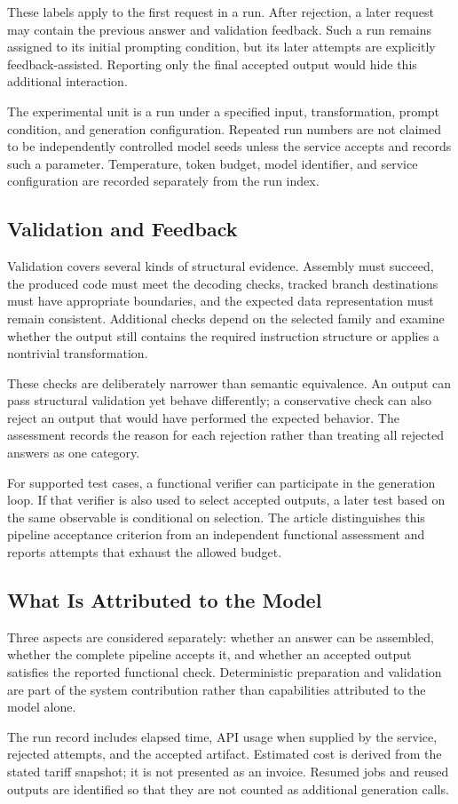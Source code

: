 These labels apply to the first request in a run. After rejection, a
later request may contain the previous answer and validation feedback.
Such a run remains assigned to its initial prompting condition, but its
later attempts are explicitly feedback-assisted. Reporting only the
final accepted output would hide this additional interaction.

The experimental unit is a run under a specified input, transformation,
prompt condition, and generation configuration. Repeated run numbers
are not claimed to be independently controlled model seeds unless the
service accepts and records such a parameter. Temperature, token
budget, model identifier, and service configuration are recorded
separately from the run index.

\subsection{Validation and Feedback}
Validation covers several kinds of structural evidence. Assembly must
succeed, the produced code must meet the decoding checks, tracked branch
destinations must have appropriate boundaries, and the expected data
representation must remain consistent. Additional checks depend on the
selected family and examine whether the output still contains the
required instruction structure or applies a nontrivial transformation.

These checks are deliberately narrower than semantic equivalence.
An output can pass structural validation yet behave differently; a
conservative check can also reject an output that would have performed
the expected behavior. The assessment records the reason for each
rejection rather than treating all rejected answers as one category.

For supported test cases, a functional verifier can participate in the
generation loop. If that verifier is also used to select accepted
outputs, a later test based on the same observable is conditional on
selection. The article distinguishes this pipeline acceptance criterion
from an independent functional assessment and reports attempts that
exhaust the allowed budget.

\subsection{What Is Attributed to the Model}
Three aspects are considered separately: whether an answer can be
assembled, whether the complete pipeline accepts it, and whether an
accepted output satisfies the reported functional check. Deterministic
preparation and validation are part of the system contribution rather
than capabilities attributed to the model alone.

The run record includes elapsed time, API usage when supplied by the
service, rejected attempts, and the accepted artifact. Estimated cost
is derived from the stated tariff snapshot; it is not presented as an
invoice. Resumed jobs and reused outputs are identified so that they
are not counted as additional generation calls.
